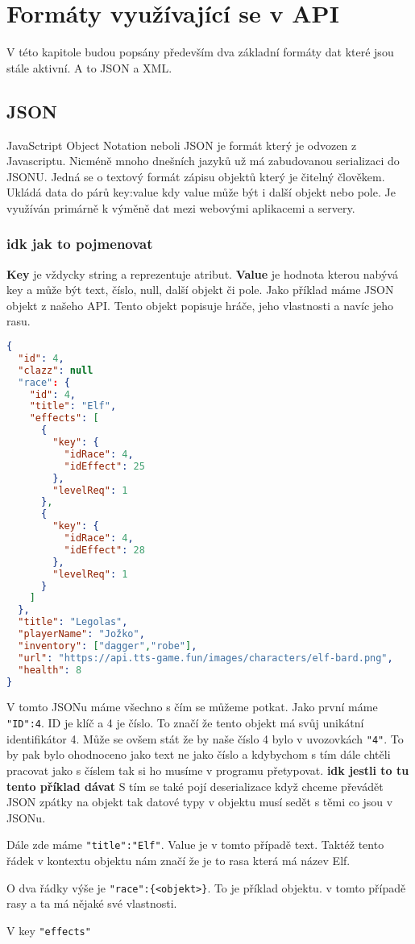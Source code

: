 \chapter{Formáty využívající se v API}
V této kapitole budou popsány především dva základní formáty dat které jsou stále aktivní. A to JSON a XML.

\section{JSON}
JavaSctript Object Notation neboli JSON je formát který je odvozen z Javascriptu. Nicméně mnoho dnešních jazyků už má zabudovanou serializaci do JSONU. Jedná se o textový formát zápisu objektů který je čitelný člověkem. Ukládá data do párů key:value kdy value může být i další objekt nebo pole. Je využíván primárně k výměně dat mezi webovými aplikacemi a servery.

\subsection{idk jak to pojmenovat}
\textbf{Key} je vždycky string a reprezentuje atribut. \textbf{Value} je hodnota kterou nabývá key a může být text, číslo, null, další objekt či pole. Jako příklad máme JSON objekt z našeho API. Tento objekt popisuje hráče, jeho vlastnosti a navíc jeho rasu.
\begin{lstlisting}[language=json, caption=Příklad JSON dokumentu]
{
  "id": 4,
  "clazz": null
  "race": {
    "id": 4,
    "title": "Elf",
    "effects": [
      {
        "key": {
          "idRace": 4,
          "idEffect": 25
        },
        "levelReq": 1
      },
      {
        "key": {
          "idRace": 4,
          "idEffect": 28
        },
        "levelReq": 1
      }
    ]
  },
  "title": "Legolas",
  "playerName": "Jožko",
  "inventory": ["dagger","robe"],
  "url": "https://api.tts-game.fun/images/characters/elf-bard.png",
  "health": 8
}
\end{lstlisting}

V tomto JSONu máme všechno s čím se můžeme potkat. Jako první máme \verb|"ID":4|. ID je klíč a 4 je číslo. To značí že tento objekt má svůj unikátní identifikátor 4. Může se ovšem stát že by naše číslo 4 bylo v uvozovkách \verb|"4"|. To by pak bylo ohodnoceno jako text ne jako číslo a kdybychom s tím dále chtěli pracovat jako s číslem tak si ho musíme v programu přetypovat. \textbf{idk jestli to tu tento příklad dávat }S tím se také pojí deserializace když chceme převádět JSON zpátky na objekt tak datové typy v objektu musí sedět s těmi co jsou v JSONu.

Dále zde máme \verb|"title":"Elf"|. Value je v tomto případě text. Taktéž tento řádek v kontextu objektu nám značí že je to rasa která má název Elf.

O dva řádky výše je \verb|"race":{<objekt>}|. To je příklad objektu. v tomto případě rasy a ta má nějaké své vlastnosti.

V key \texttt{"effects"}


\endinput